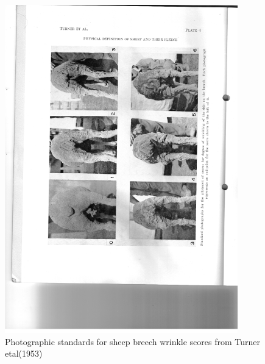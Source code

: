 %

\begin{figure}[!h]
  \centering
   \includegraphics[width=0.9\textwidth]{wrbreech.png}
  \caption{Photographic standards for sheep breech wrinkle scores from Turner etal(1953)~\cite{turn:53}}
  \label{fig:wrbreech}
\end{figure}

%

